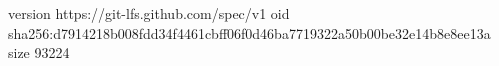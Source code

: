 version https://git-lfs.github.com/spec/v1
oid sha256:d7914218b008fdd34f4461cbff06f0d46ba7719322a50b00be32e14b8e8ee13a
size 93224
